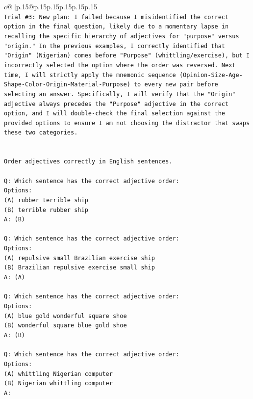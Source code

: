 \documentclass{article}
\begin{document}
{\begin{supertabular}{c@{$\;$}|p{.15\linewidth}@{}p{.15\linewidth}p{.15\linewidth}p{.15\linewidth}p{.15\linewidth}p{.15\linewidth}}
{{{\\ 
\texttt{Trial \#3: New plan: I failed because I misidentified the correct option in the final question, likely due to a momentary lapse in recalling the specific hierarchy of adjectives for "purpose" versus "origin." In the previous examples, I correctly identified that "Origin" (Nigerian) comes before "Purpose" (whittling/exercise), but I incorrectly selected the option where the order was reversed. Next time, I will strictly apply the mnemonic sequence (Opinion{-}Size{-}Age{-}Shape{-}Color{-}Origin{-}Material{-}Purpose) to every new pair before selecting an answer. Specifically, I will verify that the "Origin" adjective always precedes the "Purpose" adjective in the correct option, and I will double{-}check the final selection against the provided options to ensure I am not choosing the distractor that swaps these two categories.} \\
\\ 
\\ 
\texttt{Order adjectives correctly in English sentences.} \\
\\ 
\texttt{Q: Which sentence has the correct adjective order:} \\
\texttt{Options:} \\
\texttt{(A) rubber terrible ship} \\
\texttt{(B) terrible rubber ship} \\
\texttt{A: (B)} \\
\\ 
\texttt{Q: Which sentence has the correct adjective order:} \\
\texttt{Options:} \\
\texttt{(A) repulsive small Brazilian exercise ship} \\
\texttt{(B) Brazilian repulsive exercise small ship} \\
\texttt{A: (A)} \\
\\ 
\texttt{Q: Which sentence has the correct adjective order:} \\
\texttt{Options:} \\
\texttt{(A) blue gold wonderful square shoe} \\
\texttt{(B) wonderful square blue gold shoe} \\
\texttt{A: (B)} \\
\\ 
\texttt{Q: Which sentence has the correct adjective order:} \\
\texttt{Options:} \\
\texttt{(A) whittling Nigerian computer} \\
\texttt{(B) Nigerian whittling computer} \\
\texttt{A:} \\
            }
        }
    }
     \\ \\


\end{supertabular}}
\end{document}
